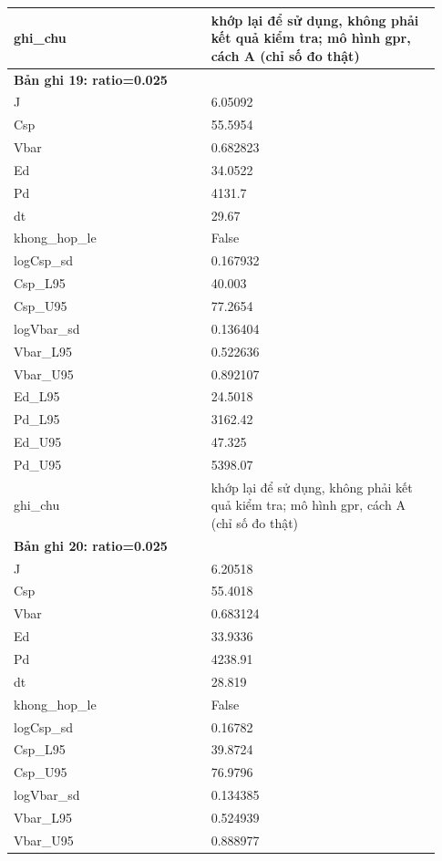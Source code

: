 \begin{longtable}{p{0.43\linewidth}p{0.50\linewidth}}
ghi\_\allowbreak chu & khớp lại để sử dụng, không phải kết quả kiểm tra; mô hình gpr, cách A (chỉ số đo thật) \\
\midrule
\multicolumn{2}{p{0.95\linewidth}}{\textbf{Bản ghi 19: ratio=0.025}} \\
J & 6.05092 \\
Csp & 55.5954 \\
Vbar & 0.682823 \\
Ed & 34.0522 \\
Pd & 4131.7 \\
dt & 29.67 \\
khong\_\allowbreak hop\_\allowbreak le & False \\
logCsp\_\allowbreak sd & 0.167932 \\
Csp\_\allowbreak L95 & 40.003 \\
Csp\_\allowbreak U95 & 77.2654 \\
logVbar\_\allowbreak sd & 0.136404 \\
Vbar\_\allowbreak L95 & 0.522636 \\
Vbar\_\allowbreak U95 & 0.892107 \\
Ed\_\allowbreak L95 & 24.5018 \\
Pd\_\allowbreak L95 & 3162.42 \\
Ed\_\allowbreak U95 & 47.325 \\
Pd\_\allowbreak U95 & 5398.07 \\
ghi\_\allowbreak chu & khớp lại để sử dụng, không phải kết quả kiểm tra; mô hình gpr, cách A (chỉ số đo thật) \\
\midrule
\multicolumn{2}{p{0.95\linewidth}}{\textbf{Bản ghi 20: ratio=0.025}} \\
J & 6.20518 \\
Csp & 55.4018 \\
Vbar & 0.683124 \\
Ed & 33.9336 \\
Pd & 4238.91 \\
dt & 28.819 \\
khong\_\allowbreak hop\_\allowbreak le & False \\
logCsp\_\allowbreak sd & 0.16782 \\
Csp\_\allowbreak L95 & 39.8724 \\
Csp\_\allowbreak U95 & 76.9796 \\
logVbar\_\allowbreak sd & 0.134385 \\
Vbar\_\allowbreak L95 & 0.524939 \\
Vbar\_\allowbreak U95 & 0.888977 \\

\end{longtable}
